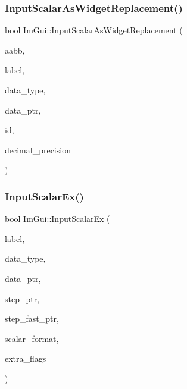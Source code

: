 \mbox{\label{namespace_im_gui_a9b7223f54687d740a5961d7f278e01ef}} 
\subsubsection{\texorpdfstring{Input\+Scalar\+As\+Widget\+Replacement()}{InputScalarAsWidgetReplacement()}}
{\footnotesize\ttfamily bool Im\+Gui\+::\+Input\+Scalar\+As\+Widget\+Replacement (\begin{DoxyParamCaption}\item[{const \mbox{\hyperlink{struct_im_rect}{Im\+Rect}} \&}]{aabb,  }\item[{const char $\ast$}]{label,  }\item[{\mbox{\hyperlink{imgui__internal_8h_a22f27475affc8d8a1f2407887e5e1d19}{Im\+Gui\+Data\+Type}}}]{data\+\_\+type,  }\item[{void $\ast$}]{data\+\_\+ptr,  }\item[{\mbox{\hyperlink{imgui_8h_a1785c9b6f4e16406764a85f32582236f}{Im\+Gui\+ID}}}]{id,  }\item[{int}]{decimal\+\_\+precision }\end{DoxyParamCaption})}

\mbox{\label{namespace_im_gui_a08c243542b1678859cf0e065f9e43865}} 
\subsubsection{\texorpdfstring{Input\+Scalar\+Ex()}{InputScalarEx()}}
{\footnotesize\ttfamily bool Im\+Gui\+::\+Input\+Scalar\+Ex (\begin{DoxyParamCaption}\item[{const char $\ast$}]{label,  }\item[{\mbox{\hyperlink{imgui__internal_8h_a22f27475affc8d8a1f2407887e5e1d19}{Im\+Gui\+Data\+Type}}}]{data\+\_\+type,  }\item[{void $\ast$}]{data\+\_\+ptr,  }\item[{void $\ast$}]{step\+\_\+ptr,  }\item[{void $\ast$}]{step\+\_\+fast\+\_\+ptr,  }\item[{const char $\ast$}]{scalar\+\_\+format,  }\item[{\mbox{\hyperlink{imgui_8h_a7d2c6153a6b9b5d3178ce82434ac9fb8}{Im\+Gui\+Input\+Text\+Flags}}}]{extra\+\_\+flags }\end{DoxyParamCaption})}

